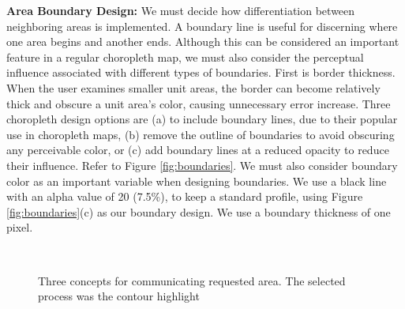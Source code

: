 \textbf{Area Boundary Design: } We must decide how differentiation between neighboring areas is implemented. A boundary line is useful for discerning where one area begins and another ends. Although this can be considered an important feature in a regular choropleth map, we must also consider the perceptual influence associated with different types of boundaries. First is border thickness. When the user examines smaller unit areas, the border can become relatively thick and obscure a unit area's color, causing unnecessary error increase. Three choropleth design options are (a) to include boundary lines, due to their popular use in choropleth maps, (b) remove the outline of boundaries to avoid obscuring any perceivable color, or (c) add boundary lines at a reduced opacity to reduce their influence. Refer to Figure \ref{fig:boundaries}. We must also consider boundary color as an important variable when designing boundaries. We use a black line with an alpha value of 20 (7.5\%), to keep a standard profile, using Figure \ref{fig:boundaries}(c) as our boundary design. We use a boundary thickness of one pixel.

\begin{figure}[t] \centering
{}~
~
\caption{Three concepts for communicating requested area. The selected process was the contour highlight } \label{fig:highlight}
\end{figure}

